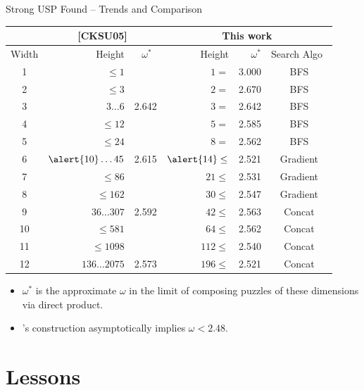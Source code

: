 \documentclass[t,10pt,
mathserif,xcolor=dvipsnames]{beamer}
\begin{document}
\begin{myframe}{Strong USP Found -- Trends and Comparison}

  \begin{center}
  \begin{tabular}{|c|r|r|r|r|c|}
    \hline
    & \multicolumn{2}{|c|}{[CKSU05]} & \multicolumn{3}{|c|}{This work} \\
    \hline
    Width & Height & $\omega^*$~ & Height & $\omega^*$ & Search Algo~\\
    \hline
    1 & $\le 1$ & & $1=$ & 3.000 & BFS \\
    2 & $\le 3$ & & $2=$ & 2.670 & BFS\\
    3 & $3 \ldots 6$ & 2.642 & $3=$ & 2.642 & BFS\\
    4 & $\le 12$ & & $5=$ & 2.585 & BFS\\
    5 & $\le 24$ & & $8=$ & 2.562 & BFS \\
    6 & $\alert{10} \ldots 45$ & \alert{2.615} &$\alert{14}\le$ & \alert{2.521} & Gradient\\
    7 & $\le 86$ & & $21\le$ & 2.531 & Gradient\\
    8 & $\le 162$ & & $30\le$ & 2.547 & Gradient\\
    9 & $36 \ldots 307$ & 2.592 &$42\le$ & 2.563 & Concat \\
    10 & $\le 581$ & & $64\le$ & 2.562 & Concat \\
    11 & $\le 1098$ & & $112\le$ & 2.540 & Concat\\
    12 & $136 \ldots 2075$ & 2.573 &$196\le$ & 2.521 & Concat \\
    \hline
  \end{tabular}
  \end{center}
  
  \begin{itemize}
  \item $\omega^*$ is the approximate $\omega$ in the limit of
    composing puzzles of these dimensions via direct product.
  \item \;[CKSU05]'s construction asymptotically implies $\omega <
    2.48$.
  \end{itemize}
  
\end{myframe}

\section{Lessons}

\end{document}
